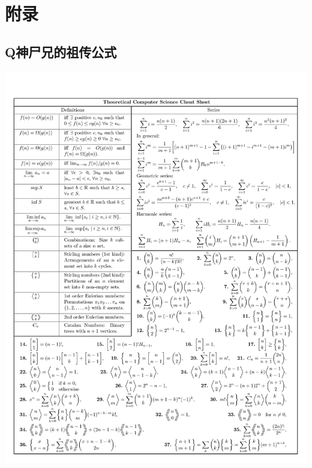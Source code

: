 \documentclass{article}
\begin{document}
\section{附录}
\subsection{Q神尸兄的祖传公式}

\newpage
\includegraphics[trim = 6mm 2mm 0mm 10mm,clip=true,scale = 0.73]{./images/image-0001.jpg}
\newpage
\end{document}

